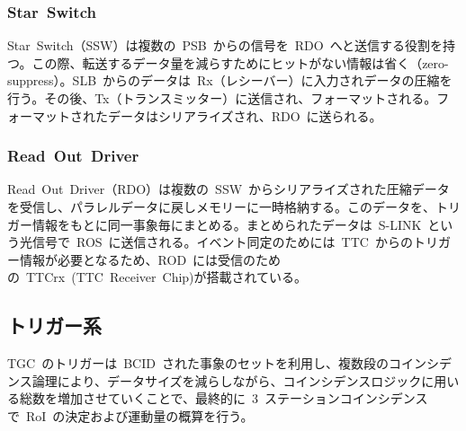 \subsubsection{Star~Switch}
Star~Switch（SSW）は複数の~PSB~からの信号を~RDO~へと送信する役割を持つ。この際、転送するデータ量を減らすためにヒットがない情報は省く（zero-suppress）。SLB~からのデータは~Rx（レシーバー）に入力されデータの圧縮を行う。その後、Tx（トランスミッター）に送信され、フォーマットされる。フォーマットされたデータはシリアライズされ、RDO~に送られる。

\subsubsection{Read~Out~Driver}
Read~Out~Driver（RDO）は複数の~SSW~からシリアライズされた圧縮データを受信し、パラレルデータに戻しメモリーに一時格納する。このデータを、トリガー情報をもとに同一事象毎にまとめる。まとめられたデータは~S-LINK~という光信号で~ROS~に送信される。イベント同定のためには~TTC~からのトリガー情報が必要となるため、ROD~には受信のための~TTCrx~(TTC~Receiver~Chip)が搭載されている。

\subsection{トリガー系}
TGC~のトリガーは~BCID~された事象のセットを利用し、複数段のコインシデンス論理により、データサイズを減らしながら、コインシデンスロジックに用いる総数を増加させていくことで、最終的に~3~ステーションコインシデンスで~RoI~の決定および運動量の概算を行う。
